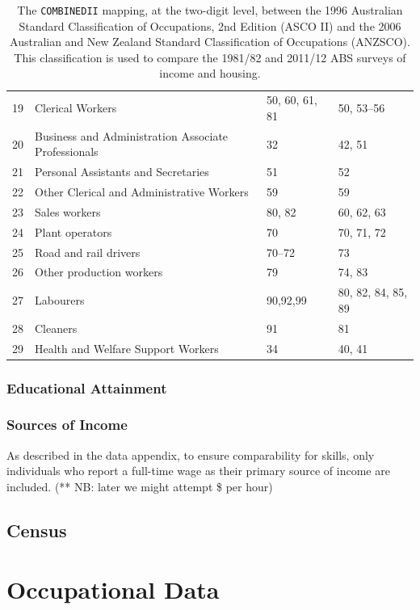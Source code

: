 \begin{table}
\begin{tabular}{clll}
  19 & Clerical Workers & 50, 60, 61, 81 & 50, 53--56 \\ 
  20 & Business and Administration Associate Professionals & 32 & 42, 51 \\ 
  21 & Personal Assistants and Secretaries & 51 & 52 \\ 
  22 & Other Clerical and Administrative Workers & 59 & 59 \\ 
  23 & Sales workers & 80, 82 & 60, 62, 63 \\ 
  24 & Plant operators & 70 & 70, 71, 72 \\ 
  25 & Road and rail drivers & 70--72 & 73 \\ 
  26 & Other production workers & 79 & 74, 83 \\ 
  27 & Labourers & 90,92,99 & 80, 82, 84, 85, 89 \\ 
  28 & Cleaners & 91 & 81 \\ 
  29 & Health and Welfare Support Workers & 34 & 40, 41 \\ 
   \hline
\end{tabular}
\caption{The {\tt COMBINEDII} mapping, at the two-digit level, between the 1996 Australian Standard Classification of Occupations, 2nd Edition (ASCO II) and the 2006 Australian and New Zealand Standard Classification of Occupations (ANZSCO). This classification is used to compare the 1981/82 and 2011/12 ABS surveys of income and housing.}
\label{tab:combined2}
\end{table}

\subsubsection{Educational Attainment}


\subsubsection{Sources of Income}

As described in the data appendix, to ensure comparability for skills, only individuals who report a full-time wage as their primary source of income are included. (** NB: later we might attempt \$ per hour)



\subsection{Census}

\section{Occupational Data}

